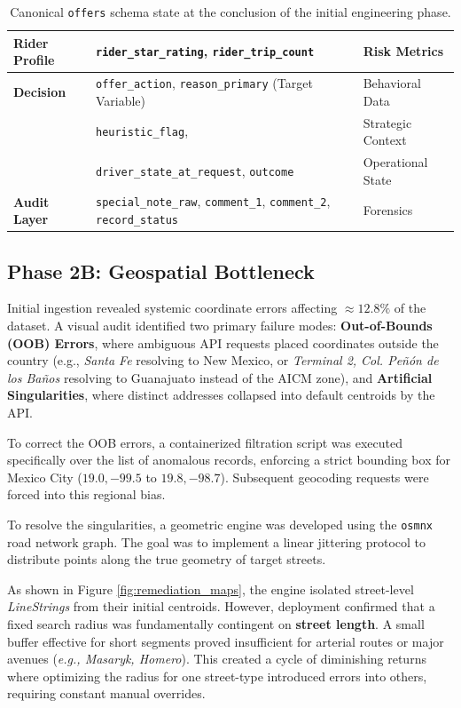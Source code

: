 \begin{table}[H]
\begin{tabularx}{\textwidth}{l p{7.5cm} l}
        \midrule
        \textbf{Rider Profile} & \texttt{rider\_star\_rating}, \texttt{rider\_trip\_count} & Risk Metrics \\
        \midrule
        \textbf{Decision}      & \texttt{offer\_action}, \texttt{reason\_primary} (Target Variable) & Behavioral Data \\
                               & \texttt{heuristic\_flag}, & Strategic Context \\
                               & \texttt{driver\_state\_at\_request}, \texttt{outcome} & Operational State \\
        \midrule
        \textbf{Audit Layer}   & \texttt{special\_note\_raw}, \texttt{comment\_1}, \texttt{comment\_2}, \texttt{record\_status} & Forensics \\
        \bottomrule
    \end{tabularx}
    \caption{Canonical \texttt{offers} schema state at the conclusion of the initial engineering phase.}
    \label{tab:fact_table}
\end{table}




\subsection{Phase 2B: Geospatial Bottleneck}


Initial ingestion revealed systemic coordinate errors affecting $\approx 12.8\%$ of the dataset. A visual audit identified two primary failure modes: \textbf{Out-of-Bounds (OOB) Errors}, where ambiguous API requests placed coordinates outside the country (e.g., \textit{Santa Fe} resolving to New Mexico, or \textit{Terminal 2, Col. Peñón de los Baños} resolving to Guanajuato instead of the AICM zone), and \textbf{Artificial Singularities}, where distinct addresses collapsed into default centroids by the API.

To correct the OOB errors, a containerized filtration script was executed specifically over the list of anomalous records, enforcing a strict bounding box for Mexico City ($19.0, -99.5$ to $19.8, -98.7$). Subsequent geocoding requests were forced into this regional bias.

To resolve the singularities, a geometric engine was developed using the \texttt{osmnx} road network graph. The goal was to implement a linear jittering protocol to distribute points along the true geometry of target streets. 

As shown in Figure \ref{fig:remediation_maps}, the engine isolated street-level \textit{LineStrings} from their initial centroids. However, deployment confirmed that a fixed search radius was fundamentally contingent on \textbf{street length}. A small buffer effective for short segments proved insufficient for arterial routes or major avenues (\textit{e.g., Masaryk, Homero}). This created a cycle of diminishing returns where optimizing the radius for one street-type introduced errors into others, requiring constant manual overrides.

